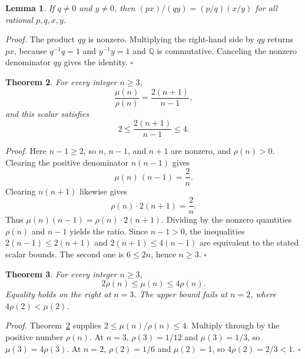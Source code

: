 \documentclass[11pt,letterpaper]{article}
\newcommand{\Q}{\mathbb{Q}}
\newtheorem{theorem}{Theorem}
\newtheorem{lemma}[theorem]{Lemma}
\newenvironment{proof}{\noindent\textit{Proof.}}{\hfill\(\square\)}
\begin{document}
\begin{lemma}
\label{lem:scale}
If $q\neq 0$ and $y\neq 0$, then $(px)/(qy)=(p/q)(x/y)$ for all rational $p,q,x,y$.
\end{lemma}

\begin{proof}
The product $qy$ is nonzero. Multiplying the right-hand side by $qy$ returns $px$, because $q^{-1}q=1$ and $y^{-1}y=1$ and $\Q$ is commutative. Canceling the nonzero denominator $qy$ gives the identity.
\end{proof}

\begin{theorem}
\label{thm:ratio}
For every integer $n\ge 3$,
\begin{equation*}
\frac{\mu(n)}{\rho(n)}=\frac{2(n+1)}{n-1},
\end{equation*}
and this scalar satisfies
\begin{equation*}
2\le\frac{2(n+1)}{n-1}\le 4.
\end{equation*}
\end{theorem}

\begin{proof}
Here $n-1\ge 2$, so $n$, $n-1$, and $n+1$ are nonzero, and $\rho(n)>0$. Clearing the positive denominator $n(n-1)$ gives
\begin{equation*}
\mu(n)\,(n-1)=\frac{2}{n}.
\end{equation*}
Clearing $n(n+1)$ likewise gives
\begin{equation*}
\rho(n)\cdot 2(n+1)=\frac{2}{n}.
\end{equation*}
Thus $\mu(n)(n-1)=\rho(n)\cdot 2(n+1)$. Dividing by the nonzero quantities $\rho(n)$ and $n-1$ yields the ratio. Since $n-1>0$, the inequalities $2(n-1)\le 2(n+1)$ and $2(n+1)\le 4(n-1)$ are equivalent to the stated scalar bounds. The second one is $6\le 2n$, hence $n\ge 3$.
\end{proof}

\begin{theorem}
\label{thm:compare}
For every integer $n\ge 3$,
\begin{equation*}
2\rho(n)\le\mu(n)\le 4\rho(n).
\end{equation*}
Equality holds on the right at $n=3$. The upper bound fails at $n=2$, where $4\rho(2)<\mu(2)$.
\end{theorem}

\begin{proof}
Theorem~\ref{thm:ratio} supplies $2\le\mu(n)/\rho(n)\le 4$. Multiply through by the positive number $\rho(n)$. At $n=3$, $\rho(3)=1/12$ and $\mu(3)=1/3$, so $\mu(3)=4\rho(3)$. At $n=2$, $\rho(2)=1/6$ and $\mu(2)=1$, so $4\rho(2)=2/3<1$.
\end{proof}
\end{document}
